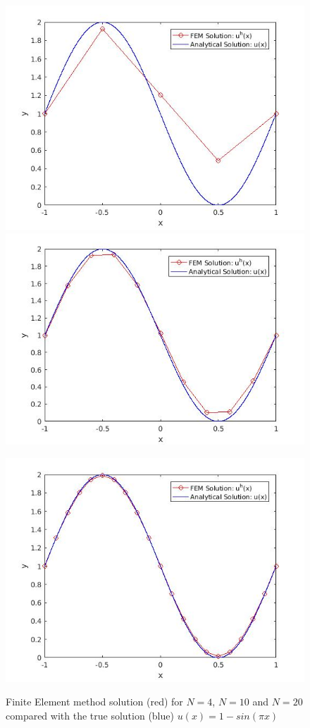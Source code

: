 \documentclass[12pt]{report}
\begin{document}
\begin{figure}[!htb]
  \includegraphics[width=\linewidth]{FEM1DN4.jpg}
  \label{fig:awesome_image1}
\endminipage\hfill
{}
  \includegraphics[width=\linewidth]{FEM1DN10.jpg}
  \label{fig:awesome_image2}
\endminipage

\centering
\includegraphics[width=0.5\linewidth]{FEM1DN20.jpg}
\label{fig:awesome_image3}
\caption{Finite Element method solution (red) for $N=4$, $N=10$ and $N=20$ compared with the true solution (blue) $u(x)=1-sin(\pi{x})$}
\end{figure}
\end{document}
